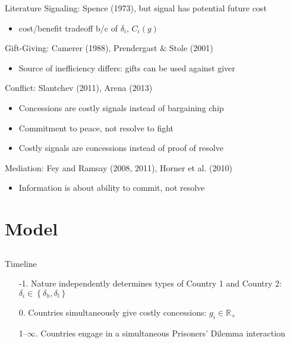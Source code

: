 \documentclass{beamer}
\newcommand{\de}{\delta}
\begin{document}
\begin{frame}{Literature}
\pause
Signaling: Spence (1973), but signal has potential future cost
\pause
		\begin{itemize}
			\item cost/benefit tradeoff b/c of $\de_i$, $C_i(g)$
		\end{itemize} 

\pause
Gift-Giving: Camerer (1988), Prendergast $\&$ Stole (2001)
\pause
		\begin{itemize}
			\item Source of inefficiency differs: gifts can be used against giver
		\end{itemize} 

\pause
Conflict: Slantchev (2011), Arena (2013)
\pause
		\begin{itemize}[<+->]
			\item Concessions are costly signals instead of bargaining chip
			\item Commitment to peace, not resolve to fight
			\item Costly signals are concessions instead of proof of resolve
		\end{itemize} 

\pause
Mediation: Fey and Ramsay (2008, 2011), Horner et al. (2010)
\pause
		\begin{itemize}
			\item Information is about ability to commit, not resolve
		\end{itemize} 
\end{frame}



\section{Model}
\subsection{}
\begin{frame}{Timeline}
\pause
\begin{enumerate}[<+->]
	\item[-1.] Nature independently determines types of Country 1 and Country 2: $\de_i \in \left\{\de_h,\de_l\right\}$
	\item[0.] Countries simultaneously give costly concessions: $g_i \in \mathbb{R}_+$
	\item[1--$\infty$.] Countries engage in a simultaneous Prisoners' Dilemma interaction 
\end{enumerate}

\end{frame}
\end{document}
